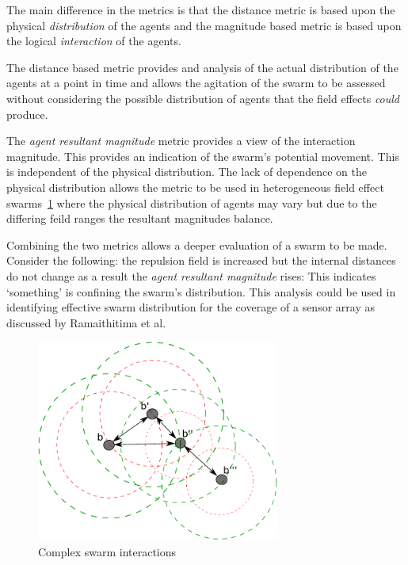\documentclass[10pt,journal,letterpaper,twoside]{IEEEtran}
\begin{document}
The main difference in the metrics is that the distance metric is based upon the physical \textit{distribution} of the agents and the magnitude based metric is based upon the logical \textit{interaction} of the agents.

The distance based metric provides and analysis of the actual distribution of the agents at a point in time and allows the agitation of the swarm to be assessed without considering the possible distribution of agents that the field effects \textit{could} produce.

The \textit{agent resultant magnitude} metric provides a view of the interaction magnitude. This provides an indication of the swarm's potential movement. This is independent of the physical distribution. The lack of dependence on the physical distribution allows the metric to be used in heterogeneous field effect swarms~\ref{additional:fieldsWork} where the physical distribution of agents may vary but due to the differing feild ranges the resultant magnitudes balance. 

Combining the two metrics allows a deeper evaluation of a swarm to be made. Consider the following: the repulsion field is increased but the internal distances do not change as a result the \textit{agent resultant magnitude} rises: This indicates `something' is confining the swarm's distribution. This analysis could be used in identifying effective swarm distribution for the coverage of a sensor array as discussed by Ramaithitima et al.~\cite{RWBK:15}

\begin{figure}[H]
\begin{center}
\includegraphics[width=8cm]{figures/FieldEffects2}
\end{center}
\caption{Complex swarm interactions\label{additional:fieldsWork}}
\end{figure}



\end{document}
